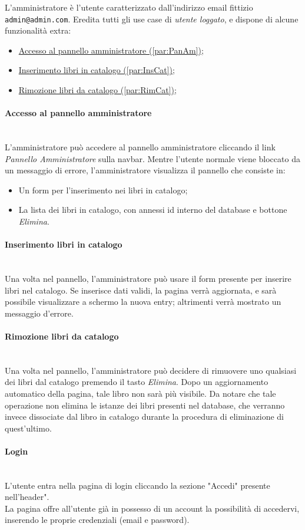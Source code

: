 L'amministratore è l'utente caratterizzato dall'indirizzo email fittizio \texttt{admin@admin.com}. Eredita tutti gli use case di \textit{utente loggato}, e dispone di alcune funzionalità extra:
\begin{itemize}
	\item \hyperref[par:PanAm]{Accesso al pannello amministratore (\ref{par:PanAm})};
	\item \hyperref[par:InsCat]{Inserimento libri in catalogo (\ref{par:InsCat})};
	\item \hyperref[par:RimCat]{Rimozione libri da catalogo (\ref{par:RimCat})};
\end{itemize}

\paragraph{Accesso al pannello amministratore}\mbox{}\\
\label{par:PanAm}
L'amministratore può accedere al pannello amministratore cliccando il link \textit{Pannello Amministratore} sulla navbar. Mentre l'utente normale viene bloccato da un messaggio di errore, l'amministratore visualizza il pannello che consiste in:
\begin{itemize}
	\item Un form per l'inserimento nei libri in catalogo;
	\item La lista dei libri in catalogo, con annessi id interno del database e bottone \textit{Elimina}.
\end{itemize}

\paragraph{Inserimento libri in catalogo}\mbox{}\\
\label{par:InsCat}
Una volta nel pannello, l'amministratore può usare il form presente per inserire libri nel catalogo. Se inserisce dati validi, la pagina verrà aggiornata, e sarà possibile visualizzare a schermo la nuova entry; altrimenti verrà mostrato un messaggio d'errore.

\paragraph{Rimozione libri da catalogo}\mbox{}\\
\label{par:RimCat}
Una volta nel pannello, l'amministratore può decidere di rimuovere uno qualsiasi dei libri dal catalogo premendo il tasto \textit{Elimina}. Dopo un aggiornamento automatico della pagina, tale libro non sarà più visibile. Da notare che tale operazione non elimina le istanze dei libri presenti nel database, che verranno invece dissociate dal libro in catalogo durante la procedura di eliminazione di quest'ultimo.

\paragraph{Login}\mbox{}\\
\label{par:Login}
L'utente entra nella pagina di login cliccando la sezione "Accedi" presente nell'header".\\
La pagina offre all'utente già in possesso di un account la possibilità di accedervi, inserendo le proprie credenziali (email e password).
